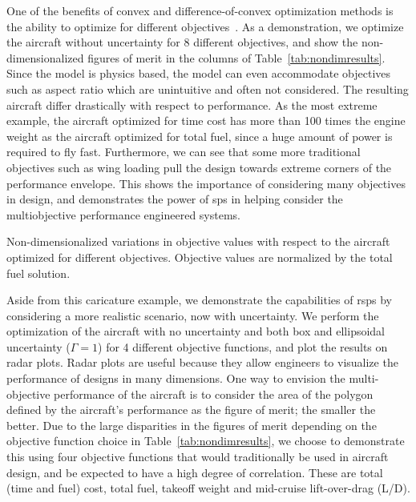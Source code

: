 One of the benefits of convex and difference-of-convex optimization methods is the ability to optimize for
different objectives~\cite{York2018}. As a demonstration, we optimize the aircraft without uncertainty
for 8 different objectives, and show
the non-dimensionalized figures of merit in the columns of Table~\ref{tab:nondimresults}.
Since the model is physics based, the model can even accommodate objectives such as aspect ratio
which are unintuitive and often not considered. The resulting aircraft
differ drastically with respect to performance.
As the most extreme example,
the aircraft optimized for time cost has more than 100 times the engine weight as the aircraft
optimized for total fuel, since a huge amount of power is required to fly fast. Furthermore, we can see
that some more traditional objectives such as wing loading pull the design
towards extreme corners of the performance envelope. This shows the importance of considering many objectives
in design, and demonstrates the power of \gls{sp}s in helping
consider the multiobjective performance engineered systems.

\begin{table}
\caption{Non-dimensionalized variations in objective values with respect to the aircraft optimized
for different objectives. Objective values are normalized by the total fuel solution.}
    \label{tab:nondimresults}
\end{table}

Aside from this caricature example, we demonstrate the capabilities of \gls{rsp}s
by considering a more realistic scenario, now with uncertainty.
We perform the optimization of the aircraft with no uncertainty and both box and
ellipsoidal uncertainty ($\Gamma = 1$)
for 4 different objective functions, and plot the results on radar plots.
Radar plots are useful because they allow engineers to visualize the performance
of designs in many dimensions. One way to envision the multi-objective
performance of the aircraft is to consider the area of the polygon defined by the aircraft's
performance as the figure of merit; the smaller the better.
Due to the large disparities in the figures of merit depending on the objective function choice
in Table~\ref{tab:nondimresults}, we choose to demonstrate this using four objective functions
that would traditionally be used in aircraft design, and be expected to have a high degree of correlation.
These are total (time and fuel) cost, total fuel, takeoff weight and mid-cruise lift-over-drag (L/D).

